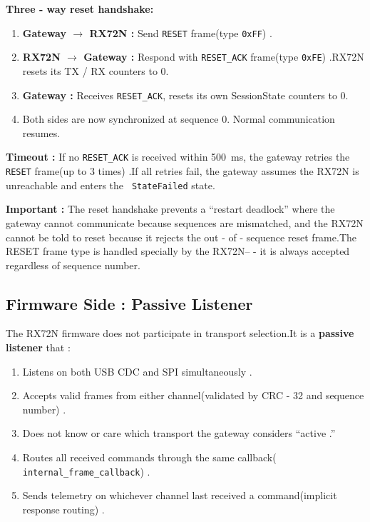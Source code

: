 \textbf{Three - way reset handshake:
}
\begin{enumerate}[leftmargin = 1.5em, topsep = 4pt, itemsep = 2pt]
    \item \textbf{Gateway $\rightarrow$
                   RX72N :} Send \texttt{RESET} frame(type \texttt{0xFF})
        .
    \item \textbf{RX72N $\rightarrow$ Gateway :
       } Respond with \texttt{RESET\_ACK} frame(type \texttt{0xFE})
        .RX72N resets its TX
    / RX counters to 0.
    \item \textbf{Gateway :} Receives \texttt{RESET\_ACK},
    resets its own SessionState counters to 0.
    \item Both sides are now synchronized at sequence
    0. Normal communication resumes.
\end{enumerate}

\textbf{Timeout :} If no \texttt{RESET\_ACK} is received within 500\, ms,
    the gateway retries the \texttt{RESET} frame(up to 3 times)
        .If all retries fail,
    the gateway assumes the RX72N is unreachable and enters the \texttt{
        StateFailed} state.

\noindent\colorbox{importantcolor} {
  \parbox{\dimexpr\linewidth - 2\fboxsep} {
\textbf{Important :
   } The reset handshake prevents a ``restart deadlock'' where the gateway
                 cannot communicate because sequences are mismatched,
        and the RX72N cannot be told to reset because it rejects the out - of -
            sequence reset frame.The RESET frame type is handled specially by
                the RX72N-- -
            it is always accepted regardless of sequence number.
 }
}

\subsection{Firmware Side : Passive Listener}

        The RX72N firmware does not participate in transport selection.It
            is a \textbf{passive listener} that :

\begin{enumerate}[leftmargin = 1.5em, topsep = 4pt, itemsep = 2pt]
    \item Listens on both USB CDC and
        SPI simultaneously
            .
    \item Accepts valid frames from either
            channel(validated by CRC - 32 and sequence number)
            .
    \item Does not know or
    care which transport the gateway considers ``active
        .''
    \item Routes all received commands through the same callback(\texttt{
            internal\_frame\_callback})
        .
    \item Sends telemetry on whichever channel last received a
            command(implicit response routing)
        .
\end{enumerate}

